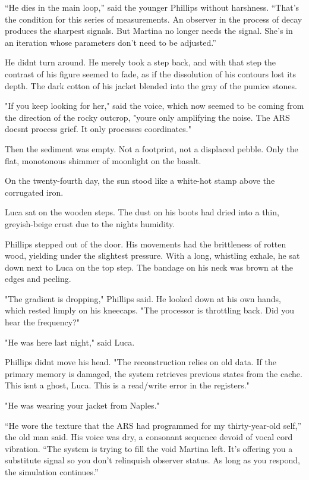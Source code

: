 \documentclass[
  ngerman,
]{article}
\begin{document}
``He dies in the main loop,'' said the younger Phillips without
harshness. ``That's the condition for this series of measurements. An
observer in the process of decay produces the sharpest signals. But
Martina no longer needs the signal. She's in an iteration whose
parameters don't need to be adjusted.''

He didn\textquotesingle t turn around. He merely took a step back, and
with that step the contrast of his figure seemed to fade, as if the
dissolution of his contours lost its depth. The dark cotton of his
jacket blended into the gray of the pumice stones.

"If you keep looking for her," said the voice, which now seemed to be
coming from the direction of the rocky outcrop, "you\textquotesingle re
only amplifying the noise. The ARS doesn\textquotesingle t process
grief. It only processes coordinates."

Then the sediment was empty. Not a footprint, not a displaced pebble.
Only the flat, monotonous shimmer of moonlight on the basalt.

On the twenty-fourth day, the sun stood like a white-hot stamp above the
corrugated iron.

Luca sat on the wooden steps. The dust on his boots had dried into a
thin, greyish-beige crust due to the night\textquotesingle s humidity.

Phillips stepped out of the door. His movements had the brittleness of
rotten wood, yielding under the slightest pressure. With a long,
whistling exhale, he sat down next to Luca on the top step. The bandage
on his neck was brown at the edges and peeling.

"The gradient is dropping," Phillips said. He looked down at his own
hands, which rested limply on his kneecaps. "The processor is throttling
back. Did you hear the frequency?"

"He was here last night," said Luca.

Phillips didn\textquotesingle t move his head. "The reconstruction
relies on old data. If the primary memory is damaged, the system
retrieves previous states from the cache. This isn\textquotesingle t a
ghost, Luca. This is a read/write error in the registers."

"He was wearing your jacket from Naples."

``He wore the texture that the ARS had programmed for my thirty-year-old
self,'' the old man said. His voice was dry, a consonant sequence devoid
of vocal cord vibration. ``The system is trying to fill the void Martina
left. It's offering you a substitute signal so you don't relinquish
observer status. As long as you respond, the simulation continues.''
\end{document}
